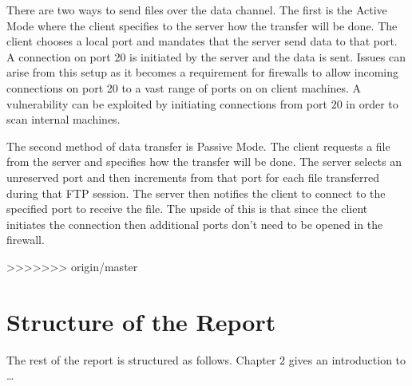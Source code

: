 There are two ways to send files over the data channel. The first is the Active Mode where the client specifies to the server how the transfer will be done. The client chooses a local port
and mandates that the server send data to that port. A connection on port 20 is initiated by the server and the data is sent. Issues can arise from this setup as it becomes a requirement
for firewalls to allow incoming connections on port 20 to a vast range of ports on on client machines. A vulnerability can be exploited by initiating connections from port 20 in order to
scan internal machines.

The second method of data transfer is Passive Mode. The client requests a file from the server and specifies how the transfer will be done. The server selects an unreserved port
and then increments from that port for each file transferred during that FTP session. The server then notifies the client to connect to the specified port to receive the file. The
upside of this is that since the client initiates the connection then additional ports don't need to be opened in the firewall.

>>>>>>> origin/master
\section{Structure of the Report}
The rest of the report is structured as follows. Chapter 2 gives an introduction to \ldots
